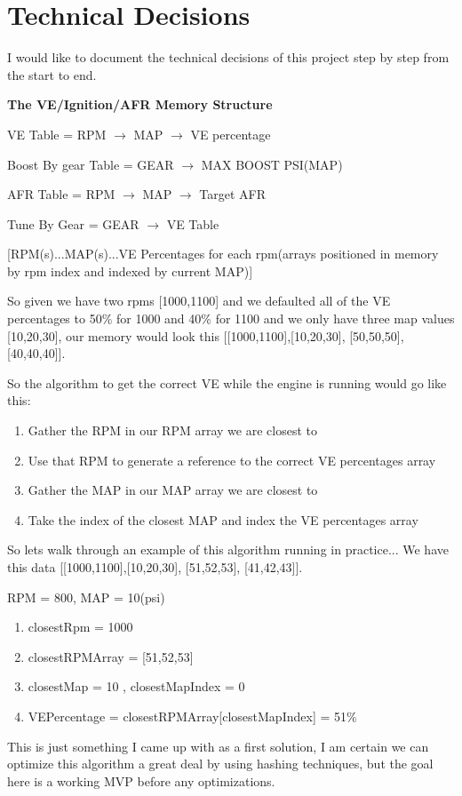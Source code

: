 \documentclass{article}
\begin{document}
\section{Technical Decisions}
I would like to document the technical decisions of this project step by step from the start to end.
\vspace{0.5cm}

\noindent
\textbf{The VE/Ignition/AFR Memory Structure}
\vspace{0.5cm}

VE Table =  RPM $\rightarrow$ MAP $\rightarrow$ VE percentage

Boost By gear Table = GEAR $\rightarrow$  MAX BOOST PSI(MAP)

AFR Table = RPM $\rightarrow$ MAP $\rightarrow$ Target AFR

Tune By Gear = GEAR $\rightarrow$ VE Table

\vspace{0.5cm}
[RPM(s)...MAP(s)...VE Percentages for each rpm(arrays positioned in memory by rpm index and indexed by current MAP)]

\vspace{0.5cm}
So given we have two rpms [1000,1100] and we defaulted all of the VE percentages to 50\% for 1000 and 40\% for 1100 and we only have three map values [10,20,30], our memory would look this [[1000,1100],[10,20,30], [50,50,50], [40,40,40]].


\vspace{0.5cm}
So the algorithm to get the correct VE while the engine is running would go like this:
\begin{enumerate}
    \item Gather the RPM in our RPM array we are closest to
    \item Use that RPM to generate a reference to the correct VE percentages array
    \item Gather the MAP in our MAP array we are closest to
    \item Take the index of the closest MAP and index the VE percentages array
\end{enumerate}

\vspace{0.5cm}
So lets walk through an example of this algorithm running in practice... We have this data [[1000,1100],[10,20,30], [51,52,53], [41,42,43]]. 

\vspace{0.5cm}
RPM = 800, MAP = 10(psi)
\begin{enumerate}
    \item closestRpm = 1000
    \item closestRPMArray = [51,52,53]
    \item closestMap = 10 , closestMapIndex = 0
    \item VEPercentage = closestRPMArray[closestMapIndex] = 51\%
\end{enumerate} 

This is just something I came up with as a first solution, I am certain we can optimize this algorithm a great deal by using hashing techniques, but the goal here is a working MVP before any optimizations.
\end{document}
